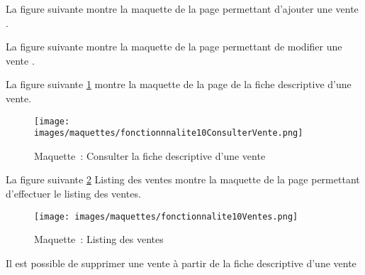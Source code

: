 La figure suivante montre la maquette de la page permettant d'ajouter une vente .

La figure suivante montre la maquette de la page permettant de modifier une vente .

La figure suivante \ref{maquette10-3} montre la maquette de la page de la fiche descriptive d'une vente.
\begin{figure}[H]
	\centering
	\texttt{[image: images/maquettes/fonctionnnalite10ConsulterVente.png]}
	\caption{Maquette~: Consulter la fiche descriptive d'une vente}
	\label{maquette10-3}
\end{figure}

La figure suivante \ref{maquette10-4} Listing des ventes montre la maquette de la page permettant d'effectuer le listing des ventes.
\begin{figure}[H]
	\centering
	\texttt{[image: images/maquettes/fonctionnalite10Ventes.png]}
	\caption{Maquette~: Listing des ventes}
	\label{maquette10-4}
\end{figure}
Il est possible de supprimer une vente à partir de la fiche descriptive d'une vente 


